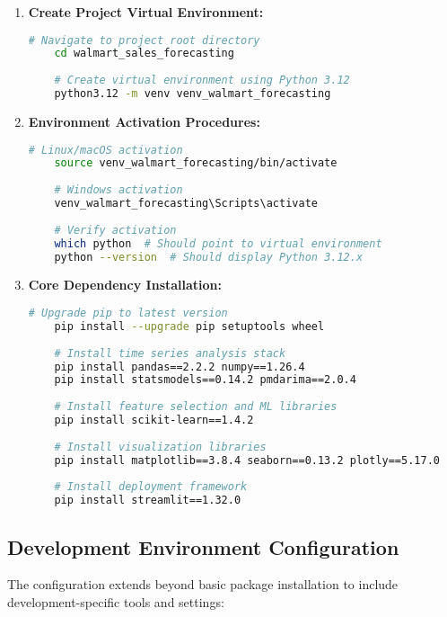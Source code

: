 \begin{enumerate}
	\item \textbf{Create Project Virtual Environment:}
	\begin{lstlisting}[language=bash]
	# Navigate to project root directory
	cd walmart_sales_forecasting
		
	# Create virtual environment using Python 3.12
	python3.12 -m venv venv_walmart_forecasting
	\end{lstlisting}
	
	\item \textbf{Environment Activation Procedures:}
	\begin{lstlisting}[language=bash]
	# Linux/macOS activation
	source venv_walmart_forecasting/bin/activate
		
	# Windows activation  
	venv_walmart_forecasting\Scripts\activate
		
	# Verify activation
	which python  # Should point to virtual environment
	python --version  # Should display Python 3.12.x
	\end{lstlisting}
	
	\item \textbf{Core Dependency Installation:}
	\begin{lstlisting}[language=bash]
	# Upgrade pip to latest version
	pip install --upgrade pip setuptools wheel
		
	# Install time series analysis stack
	pip install pandas==2.2.2 numpy==1.26.4
	pip install statsmodels==0.14.2 pmdarima==2.0.4
		
	# Install feature selection and ML libraries  
	pip install scikit-learn==1.4.2
		
	# Install visualization libraries
	pip install matplotlib==3.8.4 seaborn==0.13.2 plotly==5.17.0
		
	# Install deployment framework
	pip install streamlit==1.32.0
	\end{lstlisting}
\end{enumerate}

\subsection{Development Environment Configuration}

The configuration extends beyond basic package installation to include development-specific tools and settings:

